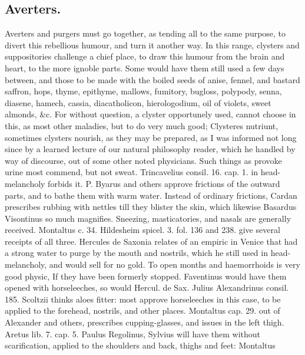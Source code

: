 \subsection{Averters.}

Averters and purgers must go together, as tending all to the same
purpose, to divert this rebellious humour, and turn it another way. In
this range, clysters and suppositories challenge a chief place, to draw
this humour from the brain and heart, to the more ignoble parts. Some
would have them still used a few days between, and those to be made
with the boiled seeds of anise, fennel, and bastard saffron, hops,
thyme, epithyme, mallows, fumitory, bugloss, polypody, senna, diasene,
hamech, cassia, diacatholicon, hierologodium, oil of violets, sweet
almonds, \&c. For without question, a clyster opportunely used, cannot
choose in this, as most other maladies, but to do very much good;
Clysteres nutriunt, sometimes clysters nourish, as they may be
prepared, as I was informed not long since by a learned lecture of our
natural philosophy reader, which he handled by way of discourse,
out of some other noted physicians. Such things as provoke urine most
commend, but not sweat. Trincavelius consil. 16. cap. 1. in
head-melancholy forbids it. P. Byarus and others approve frictions of
the outward parts, and to bathe them with warm water. Instead of
ordinary frictions, Cardan prescribes rubbing with nettles till they
blister the skin, which likewise Basardus Visontinus so much
magnifies.
Sneezing, masticatories, and nasals are generally received. Montaltus
c. 34. Hildesheim spicel. 3. fol. 136 and 238. give several receipts of
all three. Hercules de Saxonia relates of an empiric in Venice
that had a strong water to purge by the mouth and nostrils, which
he still used in head-melancholy, and would sell for no gold.
To open months and haemorrhoids is very good physic, If they have
been formerly stopped. Faventinus would have them opened with
horseleeches, so would Hercul. de Sax. Julius Alexandrinus consil. 185.
Scoltzii thinks aloes fitter: most approve horseleeches in this
case, to be applied to the forehead, nostrils, and other places.
Montaltus cap. 29. out of Alexander and others, prescribes 
cupping-glasses, and issues in the left thigh. Aretus lib. 7. cap. 5.
Paulus Regolinus, Sylvius will have them without scarification,
applied to the shoulders and back, thighs and feet: Montaltus
